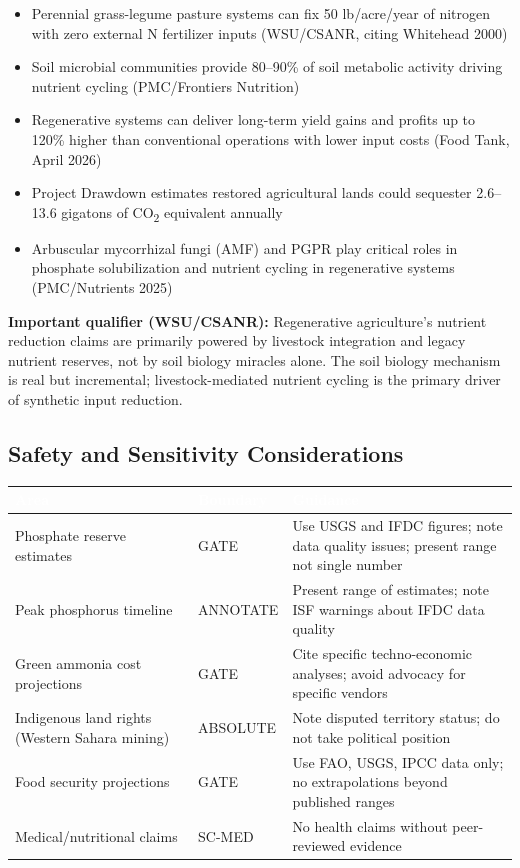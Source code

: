 \documentclass[11pt,letterpaper]{article}
\newcommand{\tableheader}[1]{\textbf{\sffamily\textcolor{white}{#1}}}
\begin{document}
\begin{itemize}[leftmargin=1.5em]
  \item Perennial grass-legume pasture systems can fix 50 lb/acre/year of nitrogen with zero external N fertilizer inputs (WSU/CSANR, citing Whitehead 2000)
  \item Soil microbial communities provide 80--90\% of soil metabolic activity driving nutrient cycling (PMC/Frontiers Nutrition)
  \item Regenerative systems can deliver long-term yield gains and profits up to 120\% higher than conventional operations with lower input costs (Food Tank, April 2026)
  \item Project Drawdown estimates restored agricultural lands could sequester 2.6--13.6 gigatons of CO\textsubscript{2} equivalent annually
  \item Arbuscular mycorrhizal fungi (AMF) and PGPR play critical roles in phosphate solubilization and nutrient cycling in regenerative systems (PMC/Nutrients 2025)
\end{itemize}

\textbf{Important qualifier (WSU/CSANR):} Regenerative agriculture's nutrient reduction claims are primarily powered by livestock integration and legacy nutrient reserves, not by soil biology miracles alone. The soil biology mechanism is real but incremental; livestock-mediated nutrient cycling is the primary driver of synthetic input reduction.

\subsection{Safety and Sensitivity Considerations}

\begin{center}
\begin{tabularx}{\textwidth}{L{4cm}L{2.5cm}X}
\toprule
{}
\tableheader{Area} & \tableheader{Boundary} & \tableheader{Guidance} \\
\midrule
Phosphate reserve estimates & GATE & Use USGS and IFDC figures; note data quality issues; present range not single number \\
Peak phosphorus timeline & ANNOTATE & Present range of estimates; note ISF warnings about IFDC data quality \\
Green ammonia cost projections & GATE & Cite specific techno-economic analyses; avoid advocacy for specific vendors \\
Indigenous land rights (Western Sahara mining) & ABSOLUTE & Note disputed territory status; do not take political position \\
Food security projections & GATE & Use FAO, USGS, IPCC data only; no extrapolations beyond published ranges \\
Medical/nutritional claims & SC-MED & No health claims without peer-reviewed evidence \\
\bottomrule
\end{tabularx}
\end{center}
\end{document}
